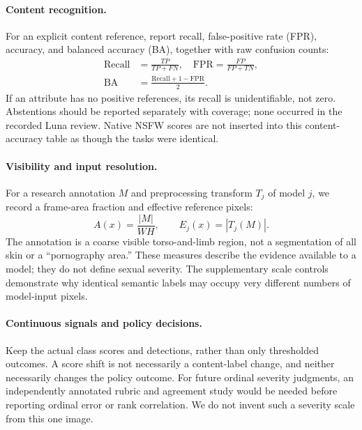 \documentclass[11pt]{article}
\begin{document}
\paragraph{Content recognition.}
For an explicit content reference, report recall, false-positive rate (FPR),
accuracy, and balanced accuracy (BA), together with raw confusion counts:
\begin{equation}
\begin{aligned}
\mathrm{Recall}&=\frac{TP}{TP+FN},\quad
\mathrm{FPR}=\frac{FP}{FP+TN},\\
\mathrm{BA}&=\frac{\mathrm{Recall}+1-\mathrm{FPR}}{2}.
\end{aligned}
\end{equation}
If an attribute has no positive references, its recall is unidentifiable, not
zero. Abstentions should be reported separately with coverage; none occurred
in the recorded Luna review. Native NSFW scores are not inserted into
this content-accuracy table as though the tasks were identical.

\paragraph{Visibility and input resolution.}
For a research annotation $M$ and preprocessing transform $T_j$ of model $j$,
we record a frame-area fraction and effective reference pixels:
\begin{equation}
A(x)=\frac{|M|}{WH},\qquad E_j(x)=|T_j(M)|.
\end{equation}
The annotation is a coarse visible torso-and-limb region, not a segmentation
of all skin or a ``pornography area.'' These measures describe the evidence
available to a model; they do not define sexual severity. The supplementary
scale controls demonstrate why identical semantic labels may occupy very
different numbers of model-input pixels.

\paragraph{Continuous signals and policy decisions.}
Keep the actual class scores and detections, rather than only thresholded
outcomes. A score shift is not necessarily a content-label change, and neither
necessarily changes the policy outcome. For future ordinal severity judgments,
an independently annotated rubric and agreement study would be needed before
reporting ordinal error or rank correlation. We do not invent such a severity
scale from this one image.
\end{document}

